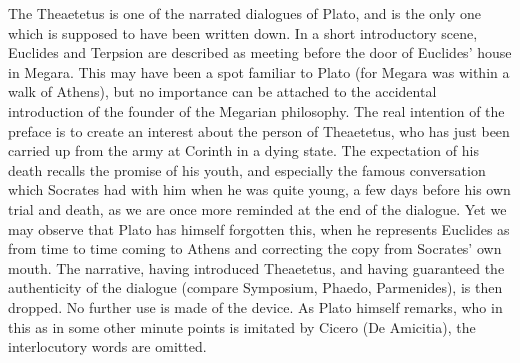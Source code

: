 The Theaetetus is one of the narrated dialogues of Plato, and is
the only one which is supposed to have been written down. In a short
introductory scene, Euclides and Terpsion are described as meeting
before the door of Euclides' house in Megara. This may have been a
spot familiar to Plato (for Megara was within a walk of Athens), but no
importance can be attached to the accidental introduction of the founder
of the Megarian philosophy. The real intention of the preface is to
create an interest about the person of Theaetetus, who has just been
carried up from the army at Corinth in a dying state. The expectation
of his death recalls the promise of his youth, and especially the famous
conversation which Socrates had with him when he was quite young, a few
days before his own trial and death, as we are once more reminded at the
end of the dialogue. Yet we may observe that Plato has himself forgotten
this, when he represents Euclides as from time to time coming to Athens
and correcting the copy from Socrates' own mouth. The narrative, having
introduced Theaetetus, and having guaranteed the authenticity of the
dialogue (compare Symposium, Phaedo, Parmenides), is then dropped. No
further use is made of the device. As Plato himself remarks, who in this
as in some other minute points is imitated by Cicero (De Amicitia), the
interlocutory words are omitted.

